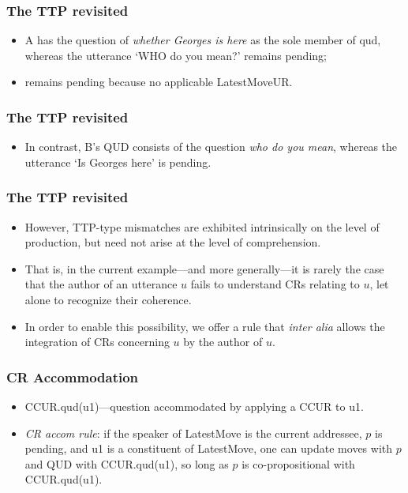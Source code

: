 \documentclass{beamer}
\newcommand{\bit}{\begin{itemize}}
\newcommand{\eit}{\end{itemize}}
\newcommand{\eeen}{\eenumsentence}
\begin{document}
\begin{frame}\frametitle{The TTP revisited}

\bit

\item  A has the question of {\it whether Georges is here} as the sole
member of {\sc qud}, whereas the utterance `WHO do you mean?' remains
pending;


\item remains pending because  no applicable LatestMoveUR.

\eit
\end{frame}
\begin{frame}\frametitle{The TTP revisited}

\bit


\item In
contrast, B's QUD consists of the question {\it who do you mean}, whereas the utterance `Is Georges here' is
pending.

\end{itemize}\end{frame}
\begin{frame}\frametitle{The TTP revisited}
\bit
\item  However, TTP-type mismatches are exhibited intrinsically on the level of
production, but need not arise at the level of comprehension.  

\item That
is, in the current example---and more generally---it is rarely the
case that the author of an utterance $u$ fails to understand CRs
relating to $u$, let alone to recognize their coherence.

\eeen{\item[] A: Who does Bo admire? b: Bo?}


\item In order to enable this possibility, we offer a rule that {\it inter
  alia} allows the integration of CRs concerning $u$ by the author of
$u$.

\end{itemize}\end{frame}


\begin{frame}\frametitle{CR Accommodation}

\bit
\item CCUR.qud(u1)---question accommodated by applying a CCUR to u1.


\item {\it CR accom rule}: if the speaker of
LatestMove is the current addressee, $p$ is pending, and u1 is a
constituent of LatestMove, one can update moves with $p$ and QUD with
CCUR.qud(u1), so long as $p$ is co-propositional with CCUR.qud(u1).
\eit
\end{frame}
\end{document}
